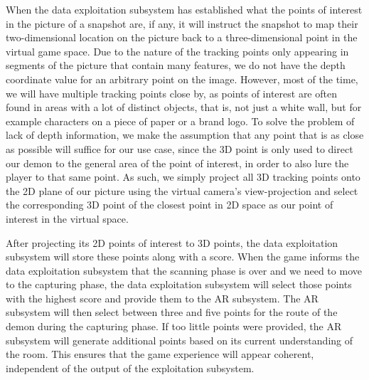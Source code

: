 When the data exploitation subsystem has established what the points of interest in the picture of a snapshot are, if any, it will instruct the snapshot to map their two-dimensional location on the picture back to a three-dimensional point in the virtual game space.
Due to the nature of the tracking points only appearing in segments of the picture that contain many features, we do not have the depth coordinate value for an arbitrary point on the image.
However, most of the time, we will have multiple tracking points close by, as points of interest are often found in areas with a lot of distinct objects, that is, not just a white wall, but for example characters on a piece of paper or a brand logo.
To solve the problem of lack of depth information, we make the assumption that any point that is as close as possible will suffice for our use case, since the 3D point is only used to direct our demon to the general area of the point of interest, in order to also lure the player to that same point.
As such, we simply project all 3D tracking points onto the 2D plane of our picture using the virtual camera's view-projection and select the corresponding 3D point of the closest point in 2D space as our point of interest in the virtual space.

After projecting its 2D points of interest to 3D points, the data exploitation subsystem will store these points along with a score.
When the game informs the data exploitation subsystem that the scanning phase is over and we need to move to the capturing phase, the data exploitation subsystem will select those points with the highest score and provide them to the AR subsystem.
The AR subsystem will then select between three and five points for the route of the demon during the capturing phase.
If too little points were provided, the AR subsystem will generate additional points based on its current understanding of the room.
This ensures that the game experience will appear coherent, independent of the output of the exploitation subsystem.
